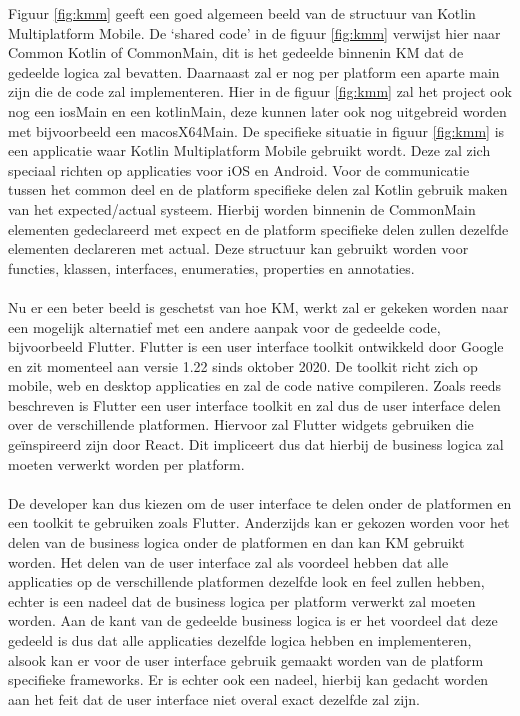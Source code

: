 Figuur \ref{fig:kmm} geeft een goed algemeen beeld van de structuur van Kotlin Multiplatform Mobile. De ‘shared code’ in de figuur \ref{fig:kmm} verwijst hier naar Common Kotlin of CommonMain, dit is het gedeelde binnenin KM dat de gedeelde logica zal bevatten. Daarnaast zal er nog per platform een aparte main zijn die de code zal implementeren. Hier in de figuur \ref{fig:kmm} zal het project ook nog een iosMain en een kotlinMain, deze kunnen later ook nog uitgebreid worden met bijvoorbeeld een macosX64Main. De specifieke situatie in figuur \ref{fig:kmm} is een applicatie waar Kotlin Multiplatform Mobile gebruikt wordt. Deze zal zich speciaal richten op applicaties voor iOS en Android.
Voor de communicatie tussen het common deel en de platform specifieke delen zal Kotlin gebruik maken van het expected/actual systeem. Hierbij worden binnenin de CommonMain elementen gedeclareerd met expect en de platform specifieke delen zullen dezelfde elementen declareren met actual. Deze structuur kan gebruikt worden voor functies, klassen, interfaces, enumeraties, properties en annotaties. 
\\ \\
Nu er een beter beeld is geschetst van hoe KM, werkt zal er gekeken worden naar een mogelijk alternatief met een andere aanpak voor de gedeelde code, bijvoorbeeld Flutter. Flutter is een user interface toolkit ontwikkeld door Google en zit momenteel aan versie 1.22 sinds oktober 2020.\autocite{Sells2020} De toolkit richt zich op mobile, web en desktop applicaties en zal de code native compileren. Zoals reeds beschreven is Flutter een user interface toolkit en zal dus de user interface delen over de verschillende platformen. Hiervoor zal Flutter widgets gebruiken die geïnspireerd zijn door React.\autocite{FlutterWidgets} Dit impliceert dus dat hierbij de business logica zal moeten verwerkt worden per platform.
\\ \\
De developer kan dus kiezen om de user interface te delen onder de platformen en een toolkit te gebruiken zoals Flutter. Anderzijds kan er gekozen worden voor het delen van de business logica onder de platformen en dan kan KM gebruikt worden. Het delen van de user interface zal als voordeel hebben dat alle applicaties op de verschillende platformen dezelfde look en feel zullen hebben, echter is een nadeel dat de business logica per platform verwerkt zal moeten worden. Aan de kant van de gedeelde business logica is er het voordeel dat deze gedeeld is dus dat alle applicaties dezelfde logica hebben en implementeren, alsook kan er voor de user interface gebruik gemaakt worden van de platform specifieke frameworks. Er is echter ook een nadeel, hierbij kan gedacht worden aan het feit dat de user interface niet overal exact dezelfde zal zijn. 


